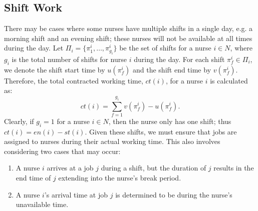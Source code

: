 \documentclass[a4paper,11pt,authoryear]{elsarticle}
\begin{document}
\subsection{Shift Work}
\label{sub:shiftwork}
\noindent There may be cases where some nurses have multiple shifts in a single day, e.g. a morning shift and an evening shift; these nurses will not be available at all times during the day. Let $\Pi_i = \{\pi_1^i,\dotsc, \pi_{g_i}^i\}$ be the set of shifts for a nurse $i \in N$, where $g_i$ is the total number of shifts for nurse $i$ during the day. For each shift $\pi_f^i \in \Pi_i$, we denote the shift start time by $u(\pi_f^i)$ and the shift end time by $v(\pi_f^i)$. Therefore, the total contracted working time, $ct(i)$, for a nurse $i$ is calculated as:
\begin{equation}
	ct(i) = \displaystyle\sum_{f=1}^{g_i} v(\pi_f^i) - u(\pi_f^i). \label{eq:contractedworkingtime}
\end{equation}
\noindent Clearly, if $g_i = 1$ for a nurse $i \in N$, then the nurse only has one shift; thus $ct(i) = en(i)-st(i)$. Given these shifts, we must ensure that jobs are assigned to nurses during their actual working time. This also involves considering two cases that may occur:
\begin{enumerate}[label={(\arabic*)}]
	\item A nurse $i$ arrives at a job $j$ during a shift, but the duration of $j$ results in the end time of $j$ extending into the nurse's break period.
	\item A nurse $i$'s arrival time at job $j$ is determined to be during the nurse's unavailable time.
\end{enumerate}
\end{document}
